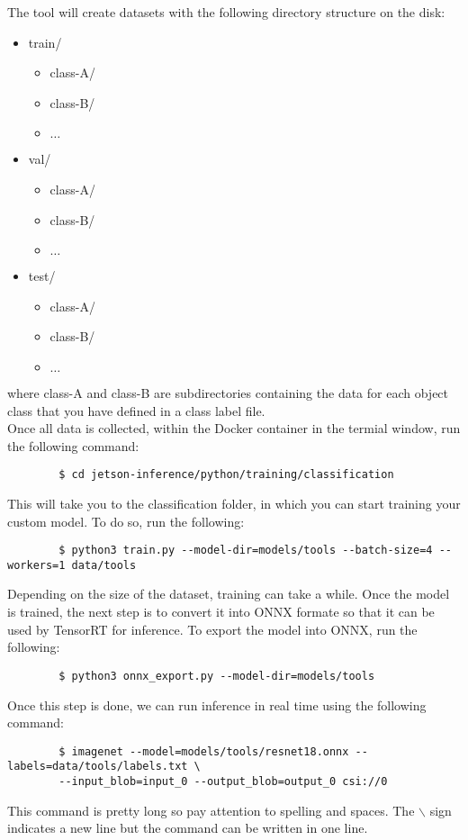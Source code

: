 \documentclass[letter, 12pt]{article}
\begin{document}
	\noindent The tool will create datasets with the following directory structure on the disk:
	\begin{itemize}
		\item train/
		\begin{itemize}
			\item class-A/
			\item class-B/
			\item $\dots$
		\end{itemize}
		\item val/
		\begin{itemize}
			\item class-A/
			\item class-B/
			\item $\dots$
		\end{itemize}
		\item test/
		\begin{itemize}
			\item class-A/
			\item class-B/
			\item $\dots$
		\end{itemize}
	\end{itemize}
	where class-A and class-B are subdirectories containing the data for each object class that you have defined in a class label file.
	\vspace{1ex} \\
	\noindent Once all data is collected, within the Docker container in the termial window, run the following command:
	\begin{verbatim}
		$ cd jetson-inference/python/training/classification
	\end{verbatim}
	\noindent This will take you to the classification folder, in which you can start training your custom model. To do so, run the following:
	\begin{verbatim}
		$ python3 train.py --model-dir=models/tools --batch-size=4 --workers=1 data/tools
	\end{verbatim}
	\noindent Depending on the size of the dataset, training can take a while. Once the model is trained, the next step is to convert it into ONNX formate so that it can be used by TensorRT for inference. To export the model into ONNX, run the following: 
	\begin{verbatim}
		$ python3 onnx_export.py --model-dir=models/tools
	\end{verbatim}
	\noindent Once this step is done, we can run inference in real time using the following command:
	\begin{verbatim}
		$ imagenet --model=models/tools/resnet18.onnx --labels=data/tools/labels.txt \
		--input_blob=input_0 --output_blob=output_0 csi://0
	\end{verbatim}
	This command is pretty long so pay attention to spelling and spaces. The $\backslash$ sign indicates a new line but the command can be written in one line. 
\end{document}
